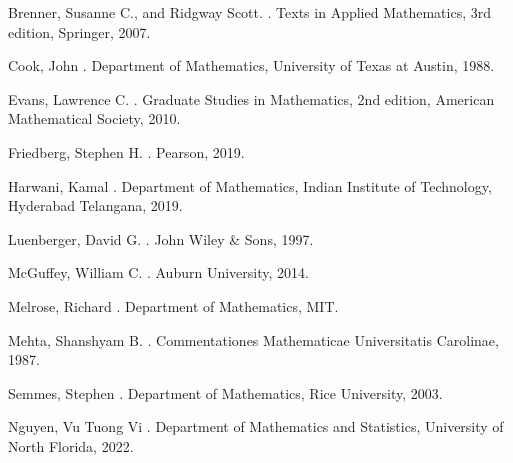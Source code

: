 \documentclass[12pt, reqno]{amsart}
\theoremstyle{definition}
\numberwithin{equation}{section}
\begin{document}
\newpage
 
\begin{thebibliography}{11}

Brenner, Susanne C., and Ridgway Scott.
.
\newblock Texts in Applied Mathematics, 3rd edition, Springer, 2007.

Cook, John
. 
\newblock Department of Mathematics, University of Texas at Austin, 1988.

Evans, Lawrence C.
.
\newblock Graduate Studies in Mathematics, 2nd edition, American Mathematical Society, 2010.

Friedberg, Stephen H.
. 
\newblock Pearson, 2019.

Harwani, Kamal
. 
\newblock Department of Mathematics, Indian Institute of Technology, Hyderabad Telangana, 2019.

Luenberger, David G.
.
\newblock John Wiley \& Sons, 1997.

McGuffey, William C.
. 
\newblock Auburn University, 2014.

Melrose, Richard
. 
\newblock Department of Mathematics, MIT.

Mehta, Shanshyam B.
. 
\newblock Commentationes Mathematicae Universitatis Carolinae, 1987.

Semmes, Stephen
. 
\newblock Department of Mathematics, Rice University, 2003.

Nguyen, Vu Tuong Vi
. 
\newblock Department of Mathematics and Statistics, University of North Florida, 2022.

\end{thebibliography}
\end{document}
